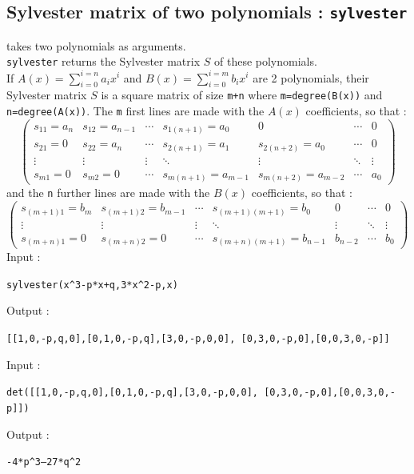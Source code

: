 \documentclass[a4paper,11pt]{book}
\begin{document}
\subsection{Sylvester matrix of two polynomials : {\tt sylvester}}
 takes two polynomials as arguments.\\
{\tt sylvester} returns the Sylvester matrix $S$ of these polynomials.\\
If $A(x)=\sum_{i=0}^{i=n} a_ix^i$ and 
$B(x)=\sum_{i=0}^{i=m}b_ix^i$ are 2 polynomials, their Sylvester matrix 
$S$ is a square matrix of size {\tt m+n} where {\tt m=degree(B(x))} and 
{\tt n=degree(A(x))}. The {\tt m} first lines are made with the  $A(x)$
coefficients, so that :
$$\left(\begin{array}{ccccccc}
s_{11}=a_n & s_{12}=a_{n-1}& \cdots & s_{1(n+1)}=a_0 & 0 & \cdots & 0\\
s_{21}=0 & s_{22}=a_{n}& \cdots & s_{2(n+1)}=a_1 & s_{2(n+2)}=a_0 & \cdots & 0\\
\vdots &\vdots &\vdots &\ddots &\vdots &\ddots &\vdots\\
s_{m1}=0 & s_{m2}=0& \cdots & s_{m(n+1)}=a_{m-1} & s_{m(n+2)}=a_{m-2} & \cdots&a_0 
\end{array}\right)$$
and the {\tt n} further lines  are made with the  $B(x)$
coefficients, so that :
$$\left(\begin{array}{ccccccc}
s_{(m+1)1}=b_m & s_{(m+1)2}=b_{m-1}& \cdots & s_{(m+1)(m+1)}=b_0 & 0 & \cdots & 0\\
\vdots &\vdots &\vdots &\ddots &\vdots &\ddots &\vdots\\
s_{(m+n)1}=0 & s_{(m+n)2}=0& \cdots & s_{(m+n)(m+1)}=b_{n-1}  & b_{n-2}  &\cdots&b_0 
\end{array}\right)$$
Input :
\begin{center}{\tt sylvester(x\verb|^|3-p*x+q,3*x\verb|^|2-p,x)}\end{center}
Output :
\begin{center}{\tt [[1,0,-p,q,0],[0,1,0,-p,q],[3,0,-p,0,0], [0,3,0,-p,0],[0,0,3,0,-p]]}\end{center}
Input :
\begin{center}{\tt det([[1,0,-p,q,0],[0,1,0,-p,q],[3,0,-p,0,0], [0,3,0,-p,0],[0,0,3,0,-p]])}\end{center}
Output :
\begin{center}{\tt -4*p\verb|^|3--27*q\verb|^|2}\end{center}
\end{document}
